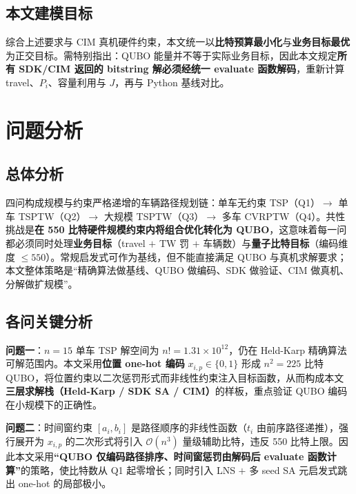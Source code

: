 \documentclass[UTF8,12pt,a4paper]{ctexart}
\begin{document}
\subsection{本文建模目标}

综合上述要求与 CIM 真机硬件约束，本文统一以\textbf{比特预算最小化}与\textbf{业务目标最优}为正交目标。需特别指出：QUBO 能量并不等于实际业务目标，因此本文规定\textbf{所有 SDK/CIM 返回的 bitstring 解必须经统一 evaluate 函数解码}，重新计算 travel、$P_i$、容量利用与 $J$，再与 Python 基线对比。

\section{问题分析}

\subsection{总体分析}

四问构成规模与约束严格递增的车辆路径规划链：单车无约束 TSP（Q1）$\rightarrow$ 单车 TSPTW（Q2）$\rightarrow$ 大规模 TSPTW（Q3）$\rightarrow$ 多车 CVRPTW（Q4）。共性挑战是\textbf{在 550 比特硬件规模约束内将组合优化转化为 QUBO}，这意味着每一问都必须同时处理\textbf{业务目标}（travel $+$ TW 罚 $+$ 车辆数）与\textbf{量子比特目标}（编码维度 $\le 550$）。常规启发式可作为基线，但不能直接满足 QUBO 与真机求解要求；本文整体策略是``精确算法做基线、QUBO 做编码、SDK 做验证、CIM 做真机、分解做扩规模''。

\subsection{各问关键分析}

\textbf{问题一}：$n=15$ 单车 TSP 解空间为 $n!=1.31\!\times\!10^{12}$，仍在 Held-Karp 精确算法可解范围内。本文采用\textbf{位置 one-hot 编码} $x_{i,p}\!\in\!\{0,1\}$ 形成 $n^{2}=225$ 比特 QUBO，将位置约束以二次惩罚形式而非线性约束注入目标函数，从而构成本文\textbf{三层求解栈（Held-Karp / SDK SA / CIM）}的样板，重点验证 QUBO 编码在小规模下的正确性。

\textbf{问题二}：时间窗约束 $[a_i,b_i]$ 是路径顺序的非线性函数（$t_i$ 由前序路径递推），强行展开为 $x_{i,p}$ 的二次形式将引入 $\mathcal{O}(n^{3})$ 量级辅助比特，违反 550 比特上限。因此本文采用\textbf{``QUBO 仅编码路径排序、时间窗惩罚由解码后 evaluate 函数计算''}的策略，使比特数从 Q1 起零增长；同时引入 LNS $+$ 多 seed SA 元启发式跳出 one-hot 的局部极小。
\end{document}
